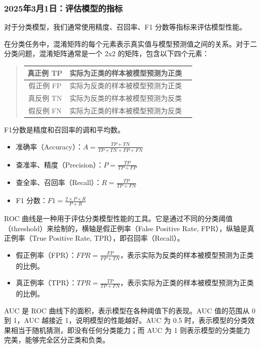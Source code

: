 \documentclass[12pt]{article}
\begin{document}
\subsubsection{2025年3月1日：评估模型的指标}
对于分类模型，我们通常使用精度、召回率、F1 分数等指标来评估模型性能。

在分类任务中，混淆矩阵的每个元素表示真实值与模型预测值之间的关系。对于二分类问题，混淆矩阵通常是一个 2x2 的矩阵，包含以下四个元素：
\begin{quote}
    \begin{table}[h]
        \centering
        \begin{tabular}{|c|c|c|}  %

            \hline
            {真正例 TP} & 实际为正类的样本被模型预测为正类 \\
            \hline
            {假正例 FP} & 实际为反类的样本被模型预测为正类 \\
            \hline
            {真反例 TN} & 实际为反类的样本被模型预测为反类 \\
            \hline
            {假反例 FN} & 实际为正类的样本被模型预测为反类 \\
            \hline
        \end{tabular}
    \end{table}

\end{quote}
F1分数是精度和召回率的调和平均数。
\begin{itemize}
    \item 准确率（Accuracy）：$A = \frac{TP+TN}{TP+TN+FP+FN}$
    \item 查准率、精度（Precision）：$P = \frac{TP}{TP+FP}$
    \item 查全率、召回率（Recall）：$R = \frac{TP}{TP+FN}$
    \item F1 分数：$F1 = \frac{2 \times P \times R}{P + R}$
\end{itemize}
ROC 曲线是一种用于评估分类模型性能的工具。它是通过不同的分类阈值（threshold）来绘制的，横轴是假正例率（False Positive Rate, FPR），纵轴是真正例率（True Positive Rate, TPR），即召回率（Recall）。
\begin{itemize}
    \item 假正例率（FPR）：$FPR = \frac{FP}{FP+TN}$，表示实际为反类的样本被模型预测为正类的比例。
    \item 真正例率（TPR）：$TPR = \frac{TP}{TP+FN}$，表示实际为正类的样本被模型预测为正类的比例。
\end{itemize}
AUC 是 ROC 曲线下的面积，表示模型在各种阈值下的表现。AUC 值的范围从 0 到 1，AUC 越接近 1，说明模型的性能越好。AUC 为 0.5 时，表示模型的分类效果相当于随机猜测，即没有任何分类能力；而 AUC 为 1 则表示模型的分类能力完美，能够完全区分正类和负类。
\end{document}
